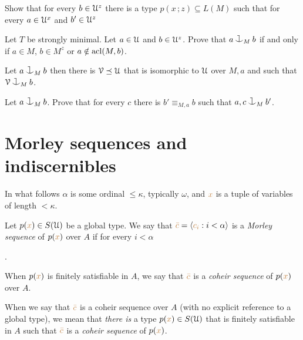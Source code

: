 \begin{exercise}\label{ex_heir_type}
  Show that for every $b\in\EuScript U^z$ there is a type $p(x\,;z)\subseteq L(M)$ such that for every  $a\in\EuScript U^x$ and $b'\in\EuScript U^z$ 
  
\end{exercise}

\begin{exercise}
  Let $T$ be strongly minimal.
  Let $a\in\EuScript U$ and $b\in\EuScript U^z$.
  Prove that $a\cnonfork_Mb$ if and only if $a\in M$, $b\in M^z$ or $a\notin{\rm acl}(M,b)$.
\end{exercise}

\begin{exercise}
  Let $a\cnonfork_M b$ then there is $\EuScript V\preceq\EuScript U$ that is isomorphic to $\EuScript U$ over $M,a$ and such that $\V\cnonfork_Mb$.
\end{exercise}

\begin{exercise}
  Let $a\cnonfork_M b$. 
  Prove that for every $c$ there is $b'\equiv_{M,a} b$ such that $a,c\cnonfork_M b'$. 
\end{exercise}
\section{Morley sequences and indiscernibles}

In what follows $\alpha$ is some ordinal $\le\kappa$, typically $\omega$, and ${\color{brown} x}$ is a tuple of variables of length $<\kappa$.

Let \mbox{$p({\color{brown} x})\in S(\EuScript U)$} be a global type.
We say that ${\color{brown}\bar c}=\langle{\color{brown}c_i}:i<\alpha\rangle$ is a \emph{Morley sequence\/} of $p({\color{brown} x})$ over $A$ if for every $i<\alpha$

.

When $p({\color{brown} x})$ is finitely satisfiable in $A$, we say that ${\color{brown}\bar c}$ is a \emph{coheir sequence\/} of $p({\color{brown} x})$ over $A$.

When we say that ${\color{brown}\bar c}$ is a coheir sequence over $A$ (with no explicit reference to a global type), we mean that \textit{there is\/} a type $p({\color{brown} x})\in S(\EuScript U)$ that is finitely satisfiable in $A$ such that ${\color{brown}\bar c}$ is a \emph{coheir sequence\/} of $p({\color{brown} x})$.

